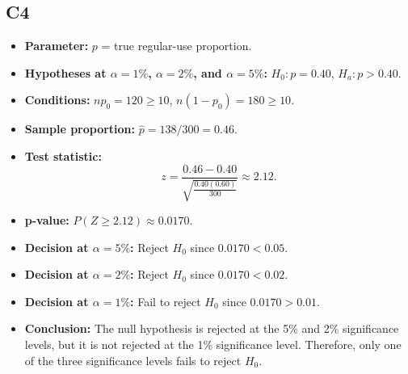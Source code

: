 \subsection*{C4}
\begin{itemize}
	\item \textbf{Parameter:} \(p\) = true regular-use proportion.
	\item \textbf{Hypotheses at \(\alpha=1\%\), \(\alpha=2\%\), and \(\alpha=5\%\):} \(H_0\colon p=0.40\), \(H_a\colon p>0.40\).
	\item \textbf{Conditions:} \(np_0=120\ge10\), \(n(1-p_0)=180\ge10\).
	\item \textbf{Sample proportion:} \(\hat p=138/300=0.46\).
	\item \textbf{Test statistic:}
	\[
	z=\frac{0.46-0.40}{\sqrt{\frac{0.40(0.60)}{300}}}\approx 2.12.
	\]
	\item \textbf{p-value:} \(P(Z\ge 2.12)\approx 0.0170\).
	\item \textbf{Decision at \(\alpha=5\%\):} Reject \(H_0\) since \(0.0170<0.05\).
	\item \textbf{Decision at \(\alpha=2\%\):} Reject \(H_0\) since \(0.0170<0.02\).
	\item \textbf{Decision at \(\alpha=1\%\):} Fail to reject \(H_0\) since \(0.0170>0.01\).
	\item \textbf{Conclusion:} The null hypothesis is rejected at the 5\% and 2\% significance levels, but it is not rejected at the 1\% significance level. Therefore, only one of the three significance levels fails to reject \(H_0\).
\end{itemize}

\begin{center}
\end{center}


\begin{center}
\end{center}


\begin{center}
\end{center}

